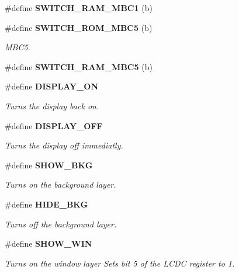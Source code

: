 \begin{CompactItemize}
\item 
\label{gb.h_a36}
\#define {\bf SWITCH\_\-RAM\_\-MBC1} (b) 
\item 
\label{gb.h_a39}
\#define {\bf SWITCH\_\-ROM\_\-MBC5} (b) 
\begin{CompactList}\small\item\em MBC5.\item\end{CompactList}

\item 
\label{gb.h_a40}
\#define {\bf SWITCH\_\-RAM\_\-MBC5} (b) 
\item 
\#define {\bf DISPLAY\_\-ON}
\begin{CompactList}\small\item\em Turns the display back on.\item\end{CompactList}

\item 
\#define {\bf DISPLAY\_\-OFF}
\begin{CompactList}\small\item\em Turns the display off immediatly.\item\end{CompactList}

\item 
\#define {\bf SHOW\_\-BKG}
\begin{CompactList}\small\item\em Turns on the background layer.\item\end{CompactList}

\item 
\#define {\bf HIDE\_\-BKG}
\begin{CompactList}\small\item\em Turns off the background layer.\item\end{CompactList}

\item 
\label{gb.h_a47}
\#define {\bf SHOW\_\-WIN}
\begin{CompactList}\small\item\em Turns on the window layer Sets bit 5 of the LCDC register to 1.\item\end{CompactList}


\end{CompactItemize}
